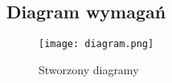 \documentclass{article}
\begin{document}
\subsection{Diagram wymagań}

\begin{figure}[h]
	\centering
	\texttt{[image: diagram.png]}
	\caption{Stworzony diagramy}
	\label{fig:Rysunek 1}
\end{figure}
\end{document}
